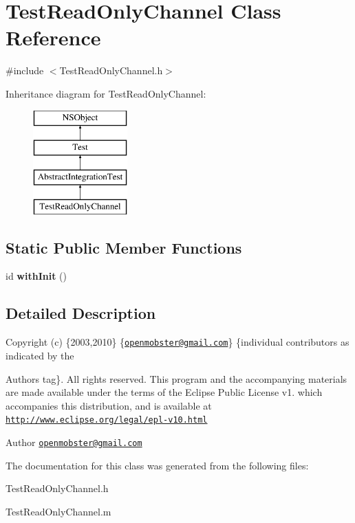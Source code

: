 \hypertarget{interface_test_read_only_channel}{
\section{\-Test\-Read\-Only\-Channel \-Class \-Reference}
\label{interface_test_read_only_channel}
}


{\ttfamily \#include $<$\-Test\-Read\-Only\-Channel.\-h$>$}

\-Inheritance diagram for \-Test\-Read\-Only\-Channel\-:\begin{figure}[H]
\begin{center}
\leavevmode
\includegraphics[height=4.000000cm]{interface_test_read_only_channel}
\end{center}
\end{figure}
\subsection*{\-Static \-Public \-Member \-Functions}
\begin{DoxyCompactItemize}
\item 
\hypertarget{interface_test_read_only_channel_a79b0f5a8749f09be864813b96cc77562}{
id {\bfseries with\-Init} ()}
\label{interface_test_read_only_channel_a79b0f5a8749f09be864813b96cc77562}

\end{DoxyCompactItemize}


\subsection{\-Detailed \-Description}
\-Copyright (c) \{2003,2010\} \{\href{mailto:openmobster@gmail.com}{\tt openmobster@gmail.\-com}\} \{individual contributors as indicated by the \begin{DoxyAuthor}{\-Authors}
tag\}. \-All rights reserved. \-This program and the accompanying materials are made available under the terms of the \-Eclipse \-Public \-License v1. which accompanies this distribution, and is available at \href{http://www.eclipse.org/legal/epl-v10.html}{\tt http\-://www.\-eclipse.\-org/legal/epl-\/v10.\-html}
\end{DoxyAuthor}
\begin{DoxyAuthor}{\-Author}
\href{mailto:openmobster@gmail.com}{\tt openmobster@gmail.\-com} 
\end{DoxyAuthor}


\-The documentation for this class was generated from the following files\-:\begin{DoxyCompactItemize}
\item 
\-Test\-Read\-Only\-Channel.\-h\item 
\-Test\-Read\-Only\-Channel.\-m\end{DoxyCompactItemize}
